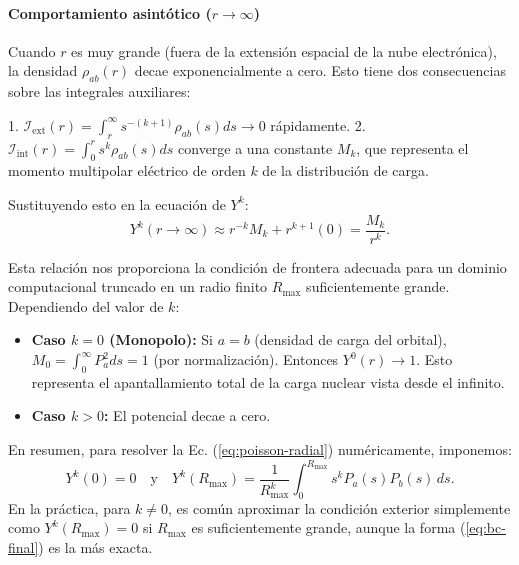 \documentclass[12pt, a4paper, oneside, spanish]{book}
\begin{document}
\paragraph{Comportamiento asintótico ($r \to \infty$)}

Cuando $r$ es muy grande (fuera de la extensión espacial de la nube electrónica), la densidad $\rho_{ab}(r)$ decae exponencialmente a cero. Esto tiene dos consecuencias sobre las integrales auxiliares:

1.  $\mathcal{I}_{\text{ext}}(r) = \int_r^\infty s^{-(k+1)}\rho_{ab}(s) ds \to 0$ rápidamente.
2.  $\mathcal{I}_{\text{int}}(r) = \int_0^r s^k \rho_{ab}(s) ds$ converge a una constante $M_k$, que representa el momento multipolar eléctrico de orden $k$ de la distribución de carga.

Sustituyendo esto en la ecuación de $Y^k$:
\begin{equation}
    Y^k(r \to \infty) \approx r^{-k} M_k + r^{k+1} (0) = \frac{M_k}{r^k}.
\end{equation}

Esta relación nos proporciona la condición de frontera adecuada para un dominio computacional truncado en un radio finito $R_{\text{max}}$ suficientemente grande. Dependiendo del valor de $k$:

\begin{itemize}
    \item \textbf{Caso $k=0$ (Monopolo):} Si $a=b$ (densidad de carga del orbital), $M_0 = \int_0^\infty P_a^2 ds = 1$ (por normalización). Entonces $Y^0(r) \to 1$. Esto representa el apantallamiento total de la carga nuclear vista desde el infinito.
    \item \textbf{Caso $k > 0$:} El potencial decae a cero.
\end{itemize}

En resumen, para resolver la Ec. (\cref{eq:poisson-radial}) numéricamente, imponemos:
\begin{equation}
\label{eq:bc-final}
    Y^k(0) = 0 \quad \text{y} \quad Y^k(R_{\text{max}}) = \frac{1}{R_{\text{max}}^k} \int_0^{R_{\text{max}}} s^k P_a(s) P_b(s) \, ds.
\end{equation}
En la práctica, para $k \neq 0$, es común aproximar la condición exterior simplemente como $Y^k(R_{\text{max}}) = 0$ si $R_{\text{max}}$ es suficientemente grande, aunque la forma (\cref{eq:bc-final}) es la más exacta.
\end{document}
